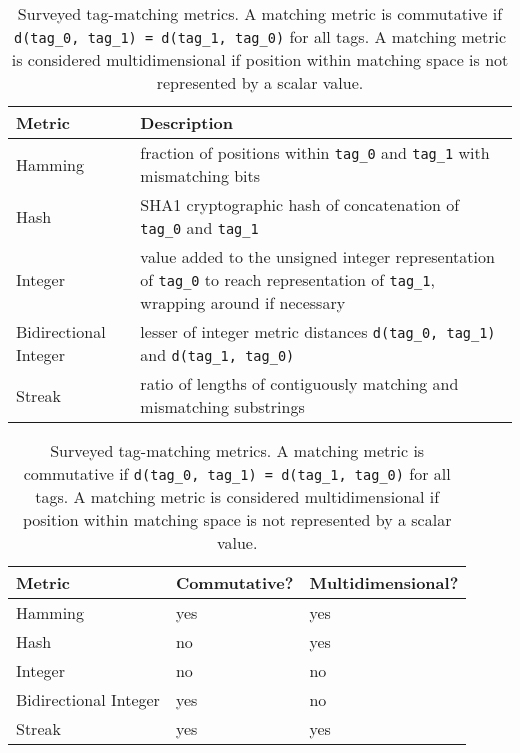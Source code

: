 \begin{table}[]
\begin{tabularx}{\textwidth}{l|X}
\textbf{Metric}       & \textbf{Description}                                                                                                                                        \\ \hline
Hamming               & fraction of positions within \texttt{tag\_0} and \texttt{tag\_1} with mismatching bits                                                                         \\ \hline
Hash                  & SHA1 cryptographic hash of  concatenation of \texttt{tag\_0} and \texttt{tag\_1} \citep{eastlake2001us}                         \\ \hline
Integer               & value added to the unsigned integer representation of \texttt{tag\_0} to reach representation of \texttt{tag\_1}, wrapping around if necessary \\ \hline
Bidirectional Integer & lesser of integer metric distances \texttt{d(tag\_0, tag\_1)} and \texttt{d(tag\_1, tag\_0)}                                                                \\ \hline
Streak                & ratio of lengths of contiguously matching and mismatching substrings \\ \hline
\end{tabularx}

\begin{tabularx}{\textwidth}{l|X|X}
\hline
\textbf{Metric}       & \textbf{Commutative?} & \textbf{Multidimensional?} \\ \hline
Hamming               & yes                   & yes                        \\ \hline
Hash                  & no                    & yes                        \\ \hline
Integer               & no                    & no                         \\ \hline
Bidirectional Integer & yes                   & no                         \\ \hline
Streak                & yes                   & yes
\end{tabularx}

\caption{
Surveyed tag-matching metrics. A matching metric is commutative if \texttt{d(tag\_0, tag\_1) = d(tag\_1, tag\_0)} for all tags.
A matching metric is considered multidimensional if position within matching space is not represented by a scalar value.
}
\label{tab:metrics}

\end{table}
